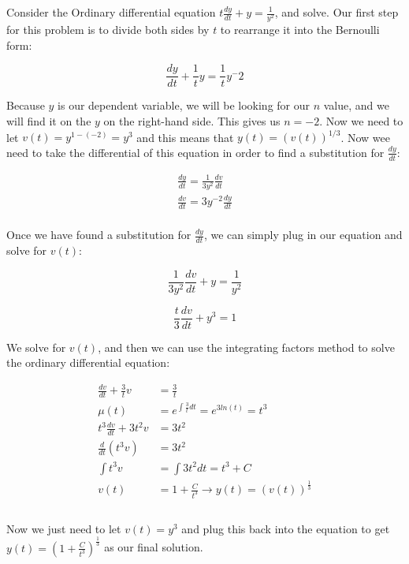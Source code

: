     \begin{problem}
      Consider the Ordinary differential equation $t\frac{dy}{dt}+y=\frac{1}{y^2}$, and solve. Our first step for this problem is to divide both sides by $t$ to rearrange it into the Bernoulli form:

      \[
        \frac{dy}{dt}+\frac{1}{t}y=\frac{1}{t}y^-2
      \]

      Because $y$ is our dependent variable, we will be looking for our $n$ value, and we will find it on the $y$ on the right-hand side. This gives us $n=-2$. Now we need to let $v(t)=y^{1-(-2)}=y^3$ and this means that $y(t)=(v(t))^{1/3}$. Now wee need to take the differential of this equation in order to find a substitution for $\frac{dy}{dt}$:

      \begin{align*}
        \frac{dy}{dt}=\frac{1}{3y^2}\frac{dv}{dt}\\
        \frac{dv}{dt}=3y^{-2}\frac{dy}{dt}\\
      \end{align*}

      Once we have found a substitution for $\frac{dy}{dt}$, we can simply plug in our equation and solve for $v(t)$:

      \[
        \frac{1}{3y^2}\frac{dv}{dt}+y=\frac{1}{y^2}
      \]

      \[
        \frac{t}{3}\frac{dv}{dt}+y^3=1
      \]

      We solve for $v(t)$, and then we can use the integrating factors method to solve the ordinary differential equation:

      \[
        \begin{aligned}
          \frac{dv}{dt}+\frac{3}{t}v&=\frac{3}{t}\\
          \mu(t)&=e^{\int\frac{3}{t}dt}=e^{3ln(t)}=t^3\\
          t^3\frac{dv}{dt}+3t^2v&=3t^2\\
          \frac{d}{dt}(t^3v)&=3t^2\\
          \int t^3v&=\int3t^2dt=t^3+C\\
          v(t)&=1+\frac{C}{t^3}\to y(t)=(v(t))^{\frac{1}{3}}\\
        \end{aligned} 
      \]\\

      Now we just need to let $v(t)=y^3$ and plug this back into the equation to get $y(t)=\left(1+\frac{C}{t^3}\right)^{\frac{1}{3}}$ as our final solution.
    \end{problem}

